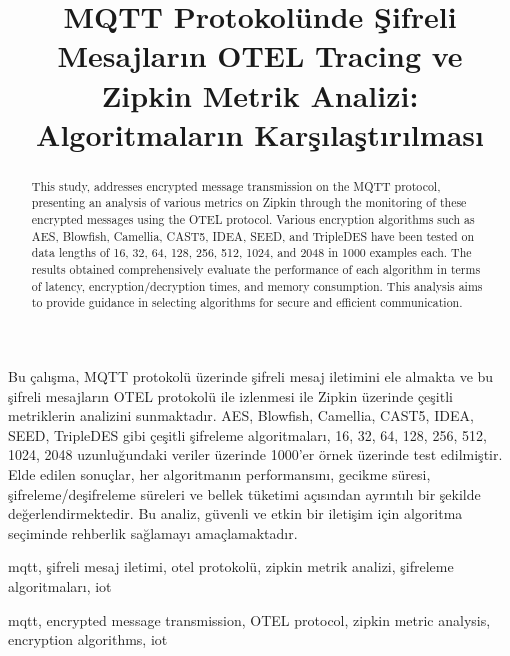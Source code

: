 \documentclass[conference, a4paper]{IEEEtran}
\begin{document}
\title{MQTT Protokolünde Şifreli Mesajların OTEL Tracing ve Zipkin Metrik Analizi: Algoritmaların Karşılaştırılması}

\author{
}

	\maketitle
	
	\begin{ozet}
		Bu çalışma, MQTT protokolü üzerinde şifreli mesaj iletimini ele almakta ve bu şifreli mesajların OTEL protokolü ile izlenmesi ile Zipkin üzerinde çeşitli metriklerin analizini sunmaktadır. AES, Blowfish, Camellia, CAST5, IDEA, SEED, TripleDES gibi çeşitli şifreleme algoritmaları, 16, 32, 64, 128, 256, 512, 1024, 2048 uzunluğundaki veriler üzerinde 1000’er  örnek üzerinde test edilmiştir. Elde edilen sonuçlar, her algoritmanın performansını, gecikme süresi, şifreleme/deşifreleme süreleri ve bellek tüketimi açısından ayrıntılı bir şekilde değerlendirmektedir. Bu analiz, güvenli ve etkin bir iletişim için algoritma seçiminde rehberlik sağlamayı amaçlamaktadır.
	\end{ozet}
	\begin{IEEEanahtar}
		mqtt, şifreli mesaj iletimi, otel protokolü, zipkin metrik analizi, şifreleme algoritmaları, iot
	\end{IEEEanahtar}
	
	\begin{abstract}
		This study, addresses encrypted message transmission on the MQTT protocol, presenting an analysis of various metrics on Zipkin through the monitoring of these encrypted messages using the OTEL protocol. Various encryption algorithms such as AES, Blowfish, Camellia, CAST5, IDEA, SEED, and TripleDES have been tested on data lengths of 16, 32, 64, 128, 256, 512, 1024, and 2048 in 1000 examples each. The results obtained comprehensively evaluate the performance of each algorithm in terms of latency, encryption/decryption times, and memory consumption. This analysis aims to provide guidance in selecting algorithms for secure and efficient communication.
	\end{abstract}
	\begin{IEEEkeywords}
		mqtt, encrypted message transmission, OTEL protocol, zipkin metric analysis, encryption algorithms, iot
	\end{IEEEkeywords}
	
\end{document}
